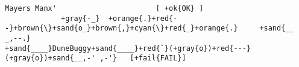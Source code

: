 \documentclass[]{article}
\begin{document}
\begin{Verbatim}[commandchars=+\{\}]
    Mayers Manx'                       [ +ok{OK} ]
             +gray{-_}  +orange{.}+red{--}+brown{\}+sand{o_}+brown{,}+cyan{\}+red{_}+orange{.}     +sand{__  _,--.}
+sand{____}DuneBuggy+sand{____}+red{`}(+gray{o})+red{---}(+gray{o})+sand{__,-' ,-'}   [+fail{FAIL}]
\end{Verbatim}
\end{document}
